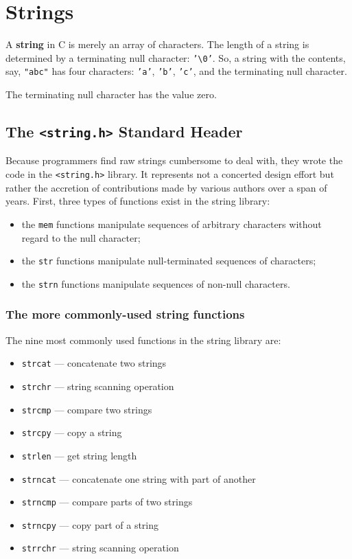 \section{Strings}
A \textbf{string} in C is merely an array of characters. The length of a string
is determined by a terminating null character: \texttt{'\textbackslash{}0'}.
So, a string with the contents, say, \texttt{"abc"} has four characters:
\texttt{'a'}, \texttt{'b'}, \texttt{'c'}, and the terminating null character.

The terminating null character has the value zero.

\subsection{The \texttt{\textless{}string.h\textgreater{}} Standard Header}
Because programmers find raw strings cumbersome to deal with, they wrote the
code in the \texttt{\textless{}string.h\textgreater{}} library. It represents
not a concerted design effort but rather the accretion of contributions made by
various authors over a span of years.  First, three types of functions exist in
the string library:

\begin{itemize}
	\item the \texttt{mem} functions manipulate sequences of arbitrary
characters without regard to the null character;
	\item the \texttt{str} functions manipulate null-terminated sequences of
characters;
	\item the \texttt{strn} functions manipulate sequences of non-null
characters.
\end{itemize}

\subsubsection{The more commonly-used string functions}
The nine most commonly used functions in the string library are:

\begin{itemize}
	\item \texttt{strcat} --- concatenate two strings
	\item \texttt{strchr} --- string scanning operation
	\item \texttt{strcmp} --- compare two strings
	\item \texttt{strcpy} --- copy a string
	\item \texttt{strlen} --- get string length
	\item \texttt{strncat} --- concatenate one string with part of another
	\item \texttt{strncmp} --- compare parts of two strings
	\item \texttt{strncpy} --- copy part of a string
	\item \texttt{strrchr} --- string scanning operation
\end{itemize}

